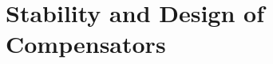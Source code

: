 \documentclass[../course]{subfiles}
\begin{document}
\chapter{Stability and Design of Compensators} \label{chp:ch04StabilityCompensators}


\end{document}
